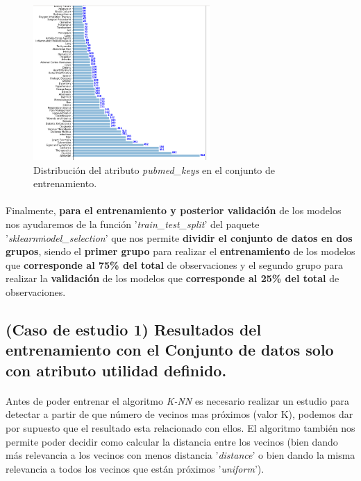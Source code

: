 \begin{figure}[!htb]
  \centering
    \includegraphics[width=0.6\textwidth]{images/resultados_knn_keywords.png}
    \caption{Distribución del atributo \textit{pubmed\_keys} en el conjunto de entrenamiento.}
  \label{knnDistKeywords}
\end{figure}

\paragraph{}
Finalmente, \textbf{para el entrenamiento y posterior validación} de los modelos nos ayudaremos de la función '\textit{train\_test\_split}'\cite{ref:knn_train_test_split} del paquete '\textit{sklearn\.model\_selection}' que nos permite \textbf{dividir el conjunto de datos en dos grupos}, siendo el \textbf{primer grupo} para realizar el \textbf{entrenamiento} de los modelos que \textbf{corresponde al 75\% del total} de observaciones y el segundo grupo para realizar la \textbf{validación} de los modelos que \textbf{corresponde al 25\% del total} de observaciones.

\subsection{(Caso de estudio 1) Resultados del entrenamiento con el Conjunto de datos solo con atributo utilidad definido.}

\paragraph{}
Antes de poder entrenar el algoritmo \textit{K-NN} es necesario realizar un estudio para detectar a partir de que número de vecinos mas próximos (valor K), podemos dar por supuesto que el resultado esta relacionado con ellos. El algoritmo también nos permite poder decidir como calcular la distancia entre los vecinos (bien dando más relevancia a los vecinos con menos distancia '\textit{distance}'\cite{ref:knn_doc} o bien dando la misma relevancia a todos los vecinos que están próximos '\textit{uniform}'\cite{ref:knn_doc}).

